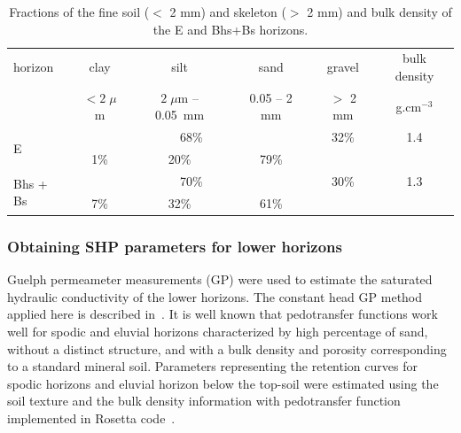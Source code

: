 \documentclass[review]{elsarticle}
\begin{document}
 \begin{table}[ht]
 	\begin{center}
 		\caption{Fractions of the fine soil ($<$ 2 mm) and skeleton ($>$ 2 mm) and bulk density of the E and Bhs+Bs horizons.}
 		\begin{small}
 			\doublespacing
 			\begin{tabular}{l c  c  c  c  c}
 				\toprule
 				horizon & clay & silt & sand  & gravel & bulk density  \\ 
 				&  $<2\;\mu$m & $2\;\mu$m -- 0.05~mm & 0.05 -- 2 mm & $>$ 2 mm & g.cm$^{-3}$ \\ \hline
 				\multirow{2}{*}{E}      & \multicolumn{3}{c}{68\%}               & \multirow{1}{*}{32\%}  &\multirow{1}{*}{1.4}   \\ 
 				\cmidrule{2-4}
 				&  1\%               & 20\%                        & 79\%      & &\\
 				
 				\multirow{2}{*}{Bhs + Bs }      & \multicolumn{3}{c}{70\%}               & \multirow{1}{*}{30\%}  &\multirow{1}{*}{1.3}   \\ 
 				\cmidrule{2-4}
 				&7\%           & 32\%                       & 61\%          & &\\
 				
 				\toprule
 			\end{tabular}
 		\end{small}
 		\label{tab:soiltxt}
 	\end{center}
 \end{table}







\subsubsection{Obtaining SHP parameters for lower horizons}
\label{shp}

Guelph permeameter measurements (GP) were used to estimate the saturated hydraulic conductivity of the lower horizons. The constant head GP method applied here is described in~\citep{Jacka1}.
It is well known that pedotransfer functions work well for spodic and eluvial horizons characterized by high percentage of sand, without a distinct structure, and with a bulk density and porosity corresponding to a standard mineral soil. Parameters representing the retention curves for spodic horizons and eluvial horizon below the top-soil were estimated using the soil texture and the bulk density information with pedotransfer function implemented in Rosetta code~\citep{Schaap}.
\end{document}
